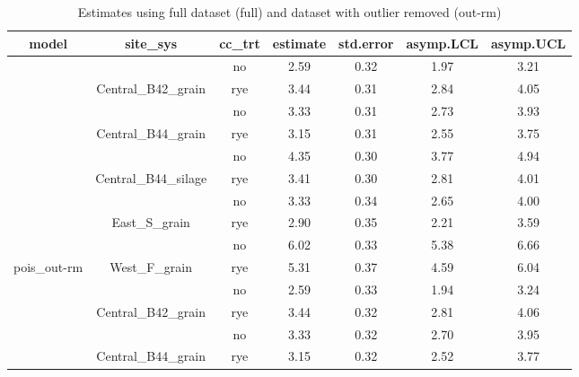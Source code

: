 \documentclass[
]{article}
\begin{document}
\begin{table}[H]

\caption{\label{tab:estimates}Estimates using full dataset (full) and dataset with outlier removed (out-rm)}
\centering
\begin{tabular}[t]{ccccccc}
\toprule
model & site\_sys & cc\_trt & estimate & std.error & asymp.LCL & asymp.UCL\\
\midrule
\rowcolor{gray!6}   &  & no & 2.59 & 0.32 & 1.97 & 3.21\\

 & \multirow{-2}{*}{\centering\arraybackslash Central\_B42\_grain} & rye & 3.44 & 0.31 & 2.84 & 4.05\\

\rowcolor{gray!6}   &  & no & 3.33 & 0.31 & 2.73 & 3.93\\

 & \multirow{-2}{*}{\centering\arraybackslash Central\_B44\_grain} & rye & 3.15 & 0.31 & 2.55 & 3.75\\

\rowcolor{gray!6}   &  & no & 4.35 & 0.30 & 3.77 & 4.94\\

 & \multirow{-2}{*}{\centering\arraybackslash Central\_B44\_silage} & rye & 3.41 & 0.30 & 2.81 & 4.01\\

\rowcolor{gray!6}   &  & no & 3.33 & 0.34 & 2.65 & 4.00\\

 & \multirow{-2}{*}{\centering\arraybackslash East\_S\_grain} & rye & 2.90 & 0.35 & 2.21 & 3.59\\

\rowcolor{gray!6}   &  & no & 6.02 & 0.33 & 5.38 & 6.66\\

\multirow{-10}{*}{\centering\arraybackslash pois\_out-rm} & \multirow{-2}{*}{\centering\arraybackslash West\_F\_grain} & rye & 5.31 & 0.37 & 4.59 & 6.04\\
\cmidrule{1-7}
\rowcolor{gray!6}   &  & no & 2.59 & 0.33 & 1.94 & 3.24\\

 & \multirow{-2}{*}{\centering\arraybackslash Central\_B42\_grain} & rye & 3.44 & 0.32 & 2.81 & 4.06\\

\rowcolor{gray!6}   &  & no & 3.33 & 0.32 & 2.70 & 3.95\\

 & \multirow{-2}{*}{\centering\arraybackslash Central\_B44\_grain} & rye & 3.15 & 0.32 & 2.52 & 3.77\\


\end{tabular}
\end{table}
\end{document}
